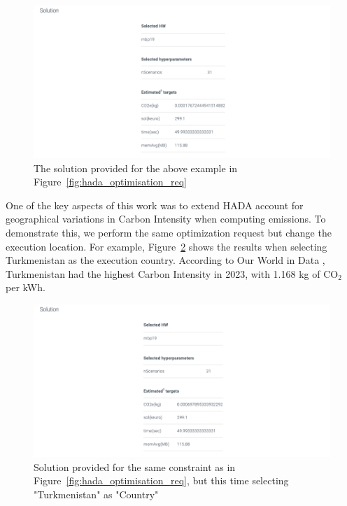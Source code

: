 \documentclass[a4paper,singleside,12pt]{report} %
\begin{document}
\begin{figure}[h!]
    \centering
    \includegraphics[width=\textwidth]{imgs/hada-solution-italy.png}
    \caption{The solution provided for the above example in Figure~\ref{fig:hada_optimisation_req}}
    \label{fig:hada_solution}
\end{figure}

One of the key aspects of this work was to extend HADA account for geographical variations in Carbon Intensity when computing emissions. To demonstrate this, we perform the same 
optimization request but change the execution location. For example, Figure~\ref{fig:hada_solution_turkmenistan} shows the results when selecting Turkmenistan as the execution country. 
According to Our World in Data \cite{ember2024carbonintensity}, Turkmenistan had the highest Carbon Intensity in 2023, with 1.168 kg of CO$_2$ per kWh.

\begin{figure}[h!]
    \centering
    \includegraphics[width=\textwidth]{imgs/hada-solution-turkmenistan.png}
    \caption{Solution provided for the same constraint as in Figure~\ref{fig:hada_optimisation_req}, but this time selecting "Turkmenistan" as "Country"}
    \label{fig:hada_solution_turkmenistan}
\end{figure}
\end{document}
